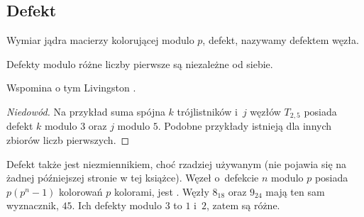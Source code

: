 
\subsection{Defekt}
%
\begin{definition}[defekt]
    Wymiar jądra macierzy kolorującej modulo $p$, defekt, nazywamy defektem węzła.
\end{definition}

\begin{proposition}
\label{no_relation_defects}%
    Defekty modulo różne liczby pierwsze są niezależne od siebie.
\end{proposition}

Wspomina o tym Livingston \cite[s. 145]{livingston1993}.

\begin{proof}[Niedowód]
    Na przykład suma spójna $k$ trójlistników i~$j$ węzłów $T_{2,5}$ posiada defekt $k$ modulo $3$ oraz $j$ modulo $5$.
    Podobne przykłady istnieją dla innych zbiorów liczb pierwszych.
\end{proof}

Defekt także jest niezmiennikiem, choć rzadziej używanym (nie pojawia się na żadnej późniejszej stronie w tej książce).
Węzeł o~defekcie $n$ modulo $p$ posiada $p(p^n-1)$ kolorowań $p$ kolorami, jest \cite[twierdzenie 2]{taalman2005}.
Węzły $8_{18}$ oraz $9_{24}$ mają ten sam wyznacznik, $45$.
Ich defekty modulo $3$ to $1$ i~$2$, zatem są różne.
%

